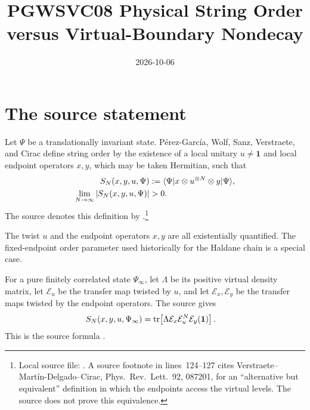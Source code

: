\documentclass[11pt]{article}
\title{PGWSVC08 Physical String Order versus Virtual-Boundary Nondecay}
\author{}
\date{2026-10-06}
\begin{document}
\maketitle
{}

\section{The source statement}

Let $\Psi$ be a translationally invariant state. P\'erez-Garc\'ia, Wolf, Sanz,
Verstraete, and Cirac define string order by the existence of a local unitary
$u\neq\mathbf{1}$ and local endpoint operators $x,y$, which may be taken
Hermitian, such that
\begin{align}
    S_N(x,y,u,\Psi)
     & := \langle \Psi|
    x\otimes u^{\otimes N}\otimes y
    |\Psi\rangle,
    \label{eq:pgwsvc08_string_order_virtual_boundary_physical_correlator} \\
    \lim_{N\to\infty}
    \left|S_N(x,y,u,\Psi)\right|
     & >0.
    \label{eq:pgwsvc08_string_order_virtual_boundary_positive_limit}
\end{align}
The source denotes this definition by 
\cite[lines~112--122]{PerezGarcia2008StringOrder}.\footnote{Local source file:
. A source footnote in
lines~124--127 cites Verstraete--Mart{\'i}n-Delgado--Cirac,
Phys.\ Rev.\ Lett.\ 92, 087201, for an ``alternative but equivalent''
definition in which the endpoints access the virtual levels. The source does
not prove this equivalence.}

The twist $u$ and the endpoint operators $x,y$ are all existentially
quantified. The fixed-endpoint order parameter used historically for the
Haldane chain is a special case.

For a pure finitely correlated state $\Psi_\infty$, let $\Lambda$ be its
positive virtual density matrix, let $\mathcal{E}_u$ be the transfer map
twisted by $u$, and let $\mathcal{E}_x,\mathcal{E}_y$ be the transfer maps
twisted by the endpoint operators. The source gives
\begin{align}
    S_N(x,y,u,\Psi_\infty)
     & =
    \operatorname{tr}\!\left[\Lambda
        \mathcal{E}_x
        \mathcal{E}_u^N
        \mathcal{E}_y(\mathbf{1})\right].
    \label{eq:pgwsvc08_string_order_virtual_boundary_source_transfer_form}
\end{align}
This is the source formula 
\cite[lines~176--181]{PerezGarcia2008StringOrder}.
\end{document}
